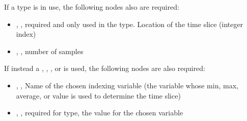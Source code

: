 If a  type is in use, the following nodes also are required:
\begin{itemize}
   \item {}, , required and only used in the
      type.  Location of the time slice (integer index)
   \item {}, , number of samples
\end{itemize}

If instead a , , , or  is used, the following nodes
are also required:
\begin{itemize}
   \item {}, ,  Name of the chosen indexing variable (the
         variable whose min, max, average, or value is used to determine the time slice)
       \item {}, ,  required for  type, the value for the chosen variable
\end{itemize}

